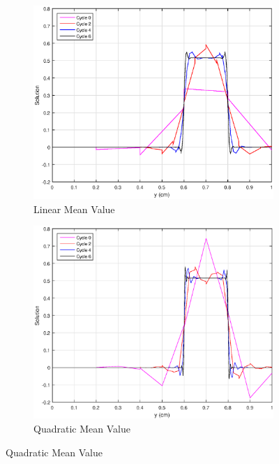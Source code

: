 \begin{figure}
{}
\vspace{2.5mm}
{
	\begin{subfigure}[b]{0.45\textwidth}
		\centering
		\label{subfig::SL_uniform_ef_pwld}
		\includegraphics[width=\textwidth]{figures/sec_BF/SL_MV_k1_uniform.eps}
		\caption{Linear Mean Value}
	\end{subfigure}
	\hfill
	\begin{subfigure}[b]{0.45\textwidth}
		\centering
		\label{subfig::SL_uniform_ef_mv}
		\includegraphics[width=\textwidth]{figures/sec_BF/SL_MV_k2_uniform.eps}
		\caption{Quadratic Mean Value}
	\end{subfigure}
}
\end{figure}
